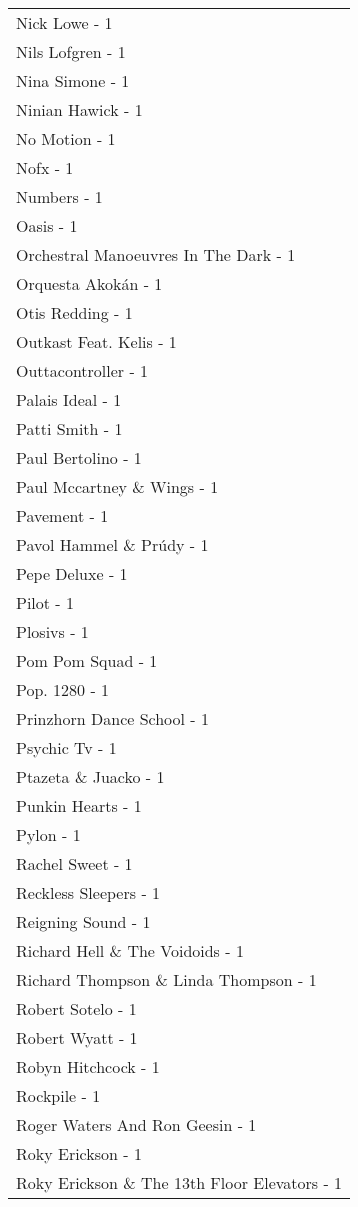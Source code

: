 \documentclass[
]{article}
\begin{document}
\begin{longtable}{l}
Nick Lowe - 1 \\ 
Nils Lofgren - 1 \\ 
Nina Simone - 1 \\ 
Ninian Hawick - 1 \\ 
No Motion - 1 \\ 
Nofx - 1 \\ 
Numbers - 1 \\ 
Oasis - 1 \\ 
Orchestral Manoeuvres In The Dark - 1 \\ 
Orquesta Akokán - 1 \\ 
Otis Redding - 1 \\ 
Outkast Feat. Kelis - 1 \\ 
Outtacontroller - 1 \\ 
Palais Ideal - 1 \\ 
Patti Smith - 1 \\ 
Paul Bertolino - 1 \\ 
Paul Mccartney \& Wings - 1 \\ 
Pavement - 1 \\ 
Pavol Hammel \& Prúdy - 1 \\ 
Pepe Deluxe - 1 \\ 
Pilot - 1 \\ 
Plosivs - 1 \\ 
Pom Pom Squad - 1 \\ 
Pop. 1280 - 1 \\ 
Prinzhorn Dance School - 1 \\ 
Psychic Tv - 1 \\ 
Ptazeta \& Juacko - 1 \\ 
Punkin Hearts - 1 \\ 
Pylon - 1 \\ 
Rachel Sweet - 1 \\ 
Reckless Sleepers - 1 \\ 
Reigning Sound - 1 \\ 
Richard Hell \& The Voidoids - 1 \\ 
Richard Thompson \& Linda Thompson - 1 \\ 
Robert Sotelo - 1 \\ 
Robert Wyatt - 1 \\ 
Robyn Hitchcock - 1 \\ 
Rockpile - 1 \\ 
Roger Waters And Ron Geesin - 1 \\ 
Roky Erickson - 1 \\ 
Roky Erickson \& The 13th Floor Elevators - 1 \\ 

\end{longtable}
\end{document}
